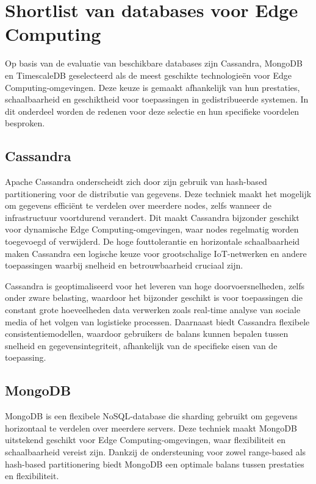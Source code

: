 \section{Shortlist van databases voor Edge Computing}

Op basis van de evaluatie van beschikbare databases zijn Cassandra, MongoDB en TimescaleDB geselecteerd als de meest geschikte technologieën voor Edge Computing-omgevingen. Deze keuze is gemaakt afhankelijk van hun prestaties, schaalbaarheid en geschiktheid voor toepassingen in gedistribueerde systemen. In dit onderdeel worden de redenen voor deze selectie en hun specifieke voordelen besproken.


\subsection{Cassandra}
Apache Cassandra onderscheidt zich door zijn gebruik van hash-based partitionering voor de distributie van gegevens. Deze techniek maakt het mogelijk om gegevens efficiënt te verdelen over meerdere nodes, zelfs wanneer de infrastructuur voortdurend verandert. Dit maakt Cassandra bijzonder geschikt voor dynamische Edge Computing-omgevingen, waar nodes regelmatig worden toegevoegd of verwijderd. De hoge fouttolerantie en horizontale schaalbaarheid maken Cassandra een logische keuze voor grootschalige IoT-netwerken en andere toepassingen waarbij snelheid en betrouwbaarheid cruciaal zijn.

Cassandra is geoptimaliseerd voor het leveren van hoge doorvoersnelheden, zelfs onder zware belasting, waardoor het bijzonder geschikt is voor toepassingen die constant grote hoeveelheden data verwerken zoals real-time analyse van sociale media of het volgen van logistieke processen. Daarnaast biedt Cassandra flexibele consistentiemodellen, waardoor gebruikers de balans kunnen bepalen tussen snelheid en gegevensintegriteit, afhankelijk van de specifieke eisen van de toepassing.

\subsection{MongoDB}
MongoDB is een flexibele NoSQL-database die sharding gebruikt om gegevens horizontaal te verdelen over meerdere servers. Deze techniek maakt MongoDB uitstekend geschikt voor Edge Computing-omgevingen, waar flexibiliteit en schaalbaarheid vereist zijn. Dankzij de ondersteuning voor zowel range-based als hash-based partitionering biedt MongoDB een optimale balans tussen prestaties en flexibiliteit.

